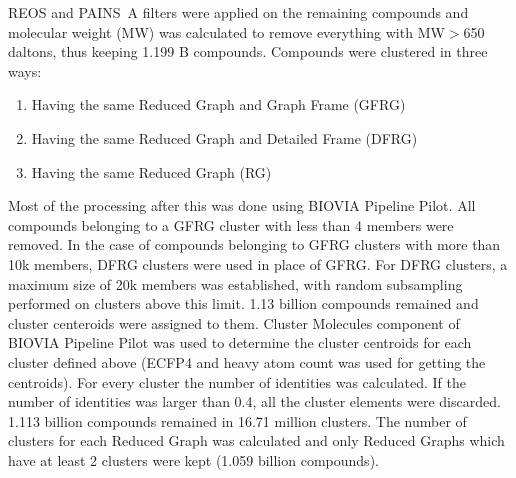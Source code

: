 \documentclass[doublespacing]{bmcart}
\begin{document}
REOS\cite{Walters1998} and PAINS~A\cite{Baell2010} filters were applied on the remaining compounds and molecular weight (MW) was calculated to remove everything with MW$>$650 daltons, thus keeping 1.199 B compounds. Compounds were clustered in three ways:
\begin{enumerate}
\item Having the same Reduced Graph and Graph Frame (GFRG)
\item Having the same Reduced Graph and Detailed Frame (DFRG)
\item  Having the same Reduced Graph (RG)
\end{enumerate}
Most of the processing after this was done using BIOVIA Pipeline Pilot\cite{biovia2020}. All compounds belonging to a GFRG cluster with less than 4 members were removed. In the case of compounds belonging to GFRG clusters with more than 10k members, DFRG clusters were used in place of GFRG. For DFRG clusters, a maximum size of 20k members was established, with random subsampling performed on clusters above this limit. 1.13 billion compounds remained and cluster centeroids were assigned to them. Cluster Molecules component of BIOVIA Pipeline Pilot\cite{biovia2020} was used to determine the cluster centroids for each cluster defined above (ECFP4 and heavy atom count was used for getting the centroids). For every cluster the number of identities was calculated. If the number of identities was larger than 0.4, all the cluster elements were discarded. 1.113 billion compounds remained in 16.71 million clusters. The number of clusters for each Reduced Graph was calculated and only Reduced Graphs which have at least 2 clusters were kept (1.059 billion compounds).
\end{document}
